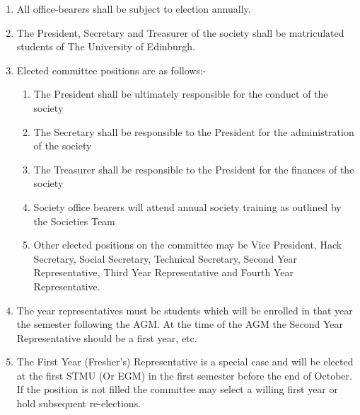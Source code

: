 \documentclass[a4paper]{article}
\begin{document}
\begin {enumerate}
  
  \item All office-bearers shall be subject to election annually.

  \item The President, Secretary and Treasurer of the society shall be matriculated students of The University of Edinburgh.

  \item Elected committee positions are as follows:-
    \begin{enumerate}
      \item The President shall be ultimately responsible for the conduct of the society
      \item The Secretary shall be responsible to the President for the administration of the society
      \item The Treasurer shall be responsible to the President for the finances of the society
      \item Society office bearers will attend annual society training as outlined by the Societies Team
      \item Other elected positions on the committee may be Vice President, Hack Secretary, Social
        Secretary, Technical Secretary, Second Year Representative, 
        Third Year Representative and Fourth Year Representative.
    \end{enumerate}

  \item The year representatives must be students which will be enrolled in that year the semester 
    following the AGM. At the time of the AGM the Second Year Representative should be a first year, etc.
  
  \item The First Year (Fresher's) Representative is a special case and will be elected at the first STMU (Or EGM)
    in the first semester before the end of October. If the position is not filled the committee may select a
    willing first year or hold subsequent re-elections.


\end{enumerate}
\end{document}
